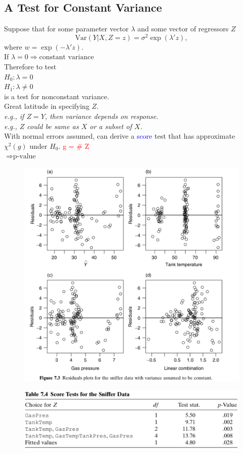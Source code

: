 \documentclass[14pt]{extarticle}
\begin{document}
\subsection*{A Test for Constant Variance}

\noindent
Suppose that for some parameter vector \( \lambda \) and some vector of regressors \( Z \)
\[
\text{Var}(Y | X, Z = z) = \sigma^2 \exp(\lambda' z),
\]
where \( w = \exp(-\lambda' z) \).\\
If \( \lambda = 0 \Rightarrow \text{constant variance} \)\\
Therefore to test\\
$H_0: \lambda = 0$\\
$H_1: \lambda \neq 0$\\
is a test for nonconstant variance.\\
Great latitude in specifying \( Z \).\\
\textit{e.g., if \( Z = Y \), then variance depends on response.}\\
\textit{e.g., \( Z \) could be same as \( X \) or a subset of \( X \).}\\
With normal errors assumed, can derive a \textcolor{blue}{score} test that has approximate \( \chi^2(g) \) under \( H_0 \).
\textcolor{red}{g = \#  Z}\\
$\Rightarrow \text{p-value}$
\begin{figure}[H]
    \centering
    \includegraphics[width=1\textwidth]{fig10.png}
\end{figure} 
\begin{figure}[H]
    \centering
    \includegraphics[width=1\textwidth]{fig11.png}
\end{figure} 
\end{document}
